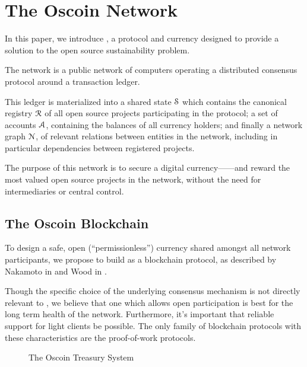 \section{The Oscoin Network}
\label{s:oscoin}

\noindent In this paper, we introduce \oscoin{}, a protocol and currency
designed to provide a solution to the open source sustainability problem.

The \oscoin{} network is a public network of computers operating a distributed
consensus protocol around a transaction ledger.

This ledger is materialized into a shared state $\mathcal{S}$ which
contains the canonical registry $\mathcal{R}$ of all open source
projects participating in the \oscoin{} protocol; a set of accounts
$\mathcal{A}$, containing the balances of all currency holders; and
finally a network graph $\mathcal{N}$, of relevant relations between
entities in the network, including in particular dependencies between
registered projects.

The purpose of this network is to secure a digital currency---\oscoin{}---and
reward the most valued open source projects in the network, without the need
for intermediaries or central control.

\subsection{The Oscoin Blockchain}

To design a safe, open (``permissionless'') currency shared amongst all network
participants, we propose to build \oscoin{} as a blockchain protocol, as
described by Nakamoto in \cite{bitcoin} and Wood in \cite{ethereum}.

Though the specific choice of the underlying consensus mechanism is not
directly relevant to \oscoin{}, we believe that one which allows open
participation is best for the long term health of the network. Furthermore,
it's important that reliable support for light clients be possible. The only
family of blockchain protocols with these characteristics are the proof-of-work
protocols.

\begin{figure*}[!ht]
    \par\medskip\noindent\minipage{\linewidth}
    \centering
    
    \caption{The Oscoin Treasury System\label{f:treasury}}
    \endminipage\par\medskip
\end{figure*}

